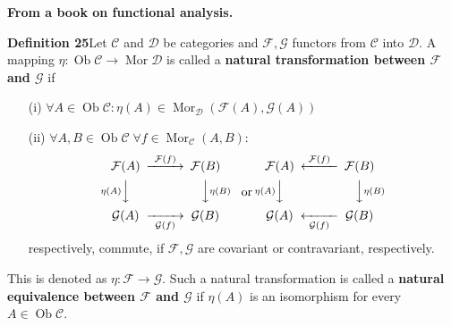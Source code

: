 \documentclass[letterpaper,landscape,KOMA,smallheadings,calcdimensions,display]{powersem}
\let\concept\textbf
\let\underl\textbf
\newenvironment{slide}{\raggedright}{}
\newenvironment{presentbox}{\par\begin{minipage}[t]{\linewidth}}{\end{minipage}\par}
\begin{document}
\begin{slide}
\ifthenelse{\isundefined{\align}\or\isundefined{\CD}}{}
{%
\begin{minipage}{\linewidth}
  \underl{From a book on functional analysis.}
  \begin{presentbox}
    \textbf{Definition 25}\quad Let $\mathcal{C}$ and $\mathcal{D}$ be categories and $\mathcal{F}, \mathcal{G}$
    functors from $\mathcal{C}$ into $\mathcal{D}$. A mapping
    $\eta:\operatorname{Ob}\mathcal{C}\to\operatorname{Mor}\mathcal{D}$ is called a \concept{natural transformation
      between $\mathcal{F}$ and $\mathcal{G}$} if
    \begin{enumerate}
    \item[(i)] $\forall
      A\in\operatorname{Ob}\mathcal{C}:
      \eta(A)\in\operatorname{Mor}_{\mathcal{D}}\left(\mathcal{F}(A),\mathcal{G}(A)\right)$
    \item[(ii)] $\forall A,B\in\operatorname{Ob}\mathcal{C}\;\forall f\in\operatorname{Mor}_{\mathcal{C}}(A,B):$
      \begin{align*}
        \begin{CD}
          \mathcal{F}(A)@>{\mathcal{F}(f)}>>\mathcal{F}(B)\\
          @V{\eta(A)}VV                     @VV{\eta(B)}V\\
          \mathcal{G}(A)@>>{\mathcal{G}(f)}>\mathcal{G}(B)\\
        \end{CD}
        &&\text{or}&&
        \begin{CD}
          \mathcal{F}(A)@<{\mathcal{F}(f)}<<\mathcal{F}(B)\\
          @V{\eta(A)}VV                     @VV{\eta(B)}V\\
          \mathcal{G}(A)@<<{\mathcal{G}(f)}<\mathcal{G}(B)\\
        \end{CD}
      \end{align*}
      respectively, commute, if $\mathcal{F}, \mathcal{G}$ are covariant or contravariant, respectively.
    \end{enumerate}
    
    This is denoted as $\eta:\mathcal{F}\to \mathcal{G}$. Such a natural transformation is called a \concept{natural
      equivalence between $\mathcal{F}$ and $\mathcal{G}$} if $\eta(A)$ is an isomorphism for every
    $A\in\operatorname{Ob}\mathcal{C}$.
  \end{presentbox}
\end{minipage}%
}

{%
\newpage
  
}
\end{slide}
\end{document}
